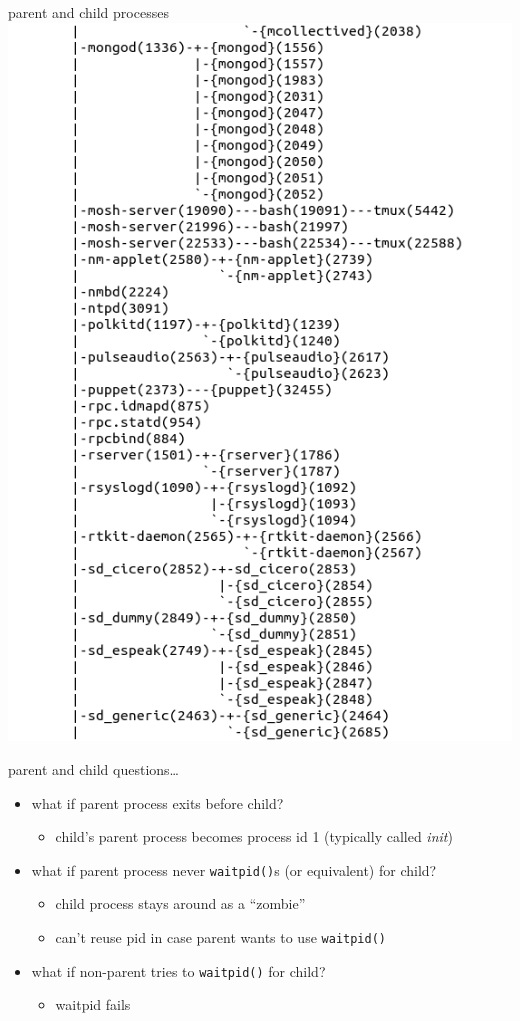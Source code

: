 \begin{frame}{parent and child processes}
    \includegraphics[height=0.6\textheight]{../unix-api/process-tree2}
\end{frame}

\begin{frame}{parent and child questions\ldots}
\begin{itemize}
    \item what if parent process exits before child?
        \begin{itemize}
        \item child's parent process becomes process id 1 (typically called \textit{init})
        \end{itemize}
    \item what if parent process never \texttt{waitpid()}s {\small (or equivalent)} for child?
        \begin{itemize}
        \item child process stays around as a ``zombie'' 
        \item can't reuse pid in case parent wants to use \texttt{waitpid()}
        \end{itemize}
    \item what if non-parent tries to \texttt{waitpid()} for child?
        \begin{itemize}
        \item waitpid fails
        \end{itemize}
\end{itemize}
\end{frame}
